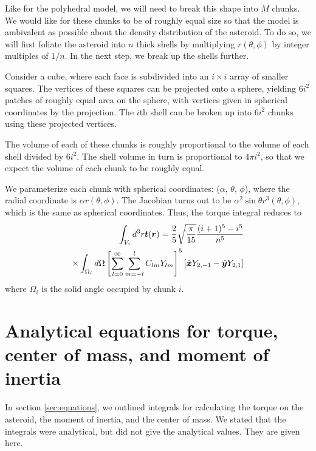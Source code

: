 \documentclass[aps,twocolumn,secnumarabic,balancelastpage,amsmath,amssymb,nofootinbib,floatfix]{revtex4-1}
\begin{document}
Like for the polyhedral model, we will need to break this shape into $M$ chunks. We would like for these chunks to be of roughly equal size so that the model is ambivalent as possible about the density distribution of the asteroid. To do so, we will first foliate the asteroid into $n$ thick shells by multiplying $r(\theta, \phi)$ by integer multiples of $1/n$. In the next step, we break up the shells further.

Consider a cube, where each face is subdivided into an $i\times i$ array of smaller squares. The vertices of these squares can be projected onto a sphere, yielding $6i^2$ patches of roughly equal area on the sphere, with vertices given in spherical coordinates by the projection. The $i$th shell can be broken up into $6i^2$ chunks using these projected vertices.

The volume of each of these chunks is roughly proportional to the volume of each shell divided by $6i^2$. The shell volume in turn is proportional to $4\pi i^2$, so that we expect the volume of each chunk to be roughly equal.



We parameterize each chunk with spherical coordinates: ($\alpha$, $\theta$, $\phi$), where the radial coordinate is $\alpha r(\theta, \phi)$. The Jacobian turns out to be $\alpha^2 \sin\theta r^3(\theta, \phi)$, which is the same as spherical coordinates. Thus, the torque integral reduces to
\begin{equation}
    \begin{aligned}
    \int_{V_i} d^3 r \bm t(\bm r) = \frac{2}{5}\sqrt{\frac{\pi}{15}}\frac{(i+1)^5-i^5}{n^5}\\
    \times\int_{\Omega_i} d\Omega \left[ \sum_{l=0}^\infty\sum_{m=-l}^l C_{lm} Y_{lm} \right]^5\left[ \hat{\bm x} Y_{2, -1} - \hat{\bm y} Y_{2, 1} \right]
    \end{aligned}
\end{equation}
where $\Omega_i$ is the solid angle occupied by chunk $i$.



\appendix
\section{Analytical equations for torque, center of mass, and moment of inertia}
In section \ref{sec:equations}, we outlined integrals for calculating the torque on the asteroid, the moment of inertia, and the center of mass. We stated that the integrals were analytical, but did not give the analytical values. They are given here.
\end{document}
